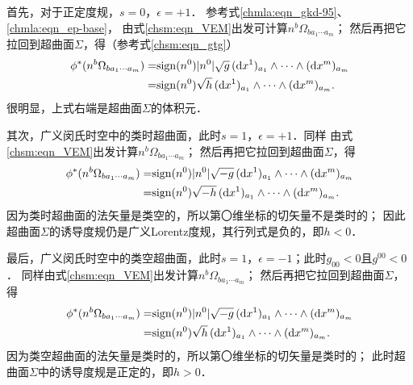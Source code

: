 首先，对于正定度规，$s=0$，$\epsilon=+1$．
参考式\eqref{chmla:eqn_gkd-95}、\eqref{chmla:eqn_ep-base}，
由式\eqref{chsm:eqn_VEM}出发可计算$n^b \Omega_{b a_1 \cdots a_m}$；
然后再把它拉回到超曲面$\Sigma$，得（参考式\eqref{chsm:eqn_gtg}）
\begin{equation}\label{chsm:eqn_induced-VE-positive}
\begin{aligned}
    \phi^*( n^b \Omega_{b a_1 \cdots a_m})=& {\rm sign}(n^0) |n^0| \sqrt{g}\,
     ({\rm d}x^1)_{a_1} \wedge \cdots \wedge({\rm d}x^m)_{a_m} \\
    =& {\rm sign}(n^0) \sqrt{h}\, ({\rm d}x^1)_{a_1} \wedge \cdots \wedge({\rm d}x^m)_{a_m}.
\end{aligned}
\end{equation}
很明显，上式右端是超曲面$\Sigma$的体积元．

其次，广义闵氏时空中的类时超曲面，此时$s=1$，$\epsilon=+1$．同样
由式\eqref{chsm:eqn_VEM}出发计算$n^b \Omega_{b a_1 \cdots a_m}$；
然后再把它拉回到超曲面$\Sigma$，得 %
\begin{equation}\label{chsm:eqn_induced-VE-TLHS}
\begin{aligned}
    \phi^*( n^b \Omega_{b a_1 \cdots a_m})=& {\rm sign}(n^0) |n^0| \sqrt{-g}\,
    ({\rm d}x^1)_{a_1} \wedge \cdots \wedge({\rm d}x^m)_{a_m} \\
    =&{\rm sign}(n^0) \sqrt{-h}\, ({\rm d}x^1)_{a_1} \wedge \cdots \wedge({\rm d}x^m)_{a_m}.
\end{aligned}
\end{equation}
因为类时超曲面的法矢量是类空的，所以第〇维坐标的切矢量不是类时的；
因此超曲面$\Sigma$的诱导度规仍是广义Lorentz度规，其行列式是负的，即$h<0$．

最后，广义闵氏时空中的类空超曲面，此时$s=1$，$\epsilon=-1$；此时$g_{00}<0$且$g^{00}<0$．
同样由式\eqref{chsm:eqn_VEM}出发计算$n^b \Omega_{b a_1 \cdots a_m}$；
然后再把它拉回到超曲面$\Sigma$，得 %
\begin{equation}\label{chsm:eqn_induced-VE-SLHS}
\begin{aligned}
    \phi^*( n^b \Omega_{b a_1 \cdots a_m})=& {\rm sign}(n^0) |n^0| \sqrt{-g}\,
      ({\rm d}x^1)_{a_1} \wedge \cdots \wedge({\rm d}x^m)_{a_m} \\
    =&{\rm sign}(n^0)\sqrt{h}\, ({\rm d}x^1)_{a_1} \wedge \cdots \wedge({\rm d}x^m)_{a_m}.
\end{aligned}
\end{equation}
因为类空超曲面的法矢量是类时的，所以第〇维坐标的切矢量是类时的；
此时超曲面$\Sigma$中的诱导度规是正定的，即$h>0$．

